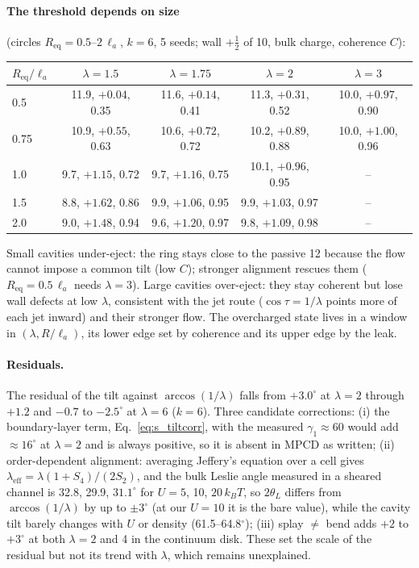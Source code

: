 \documentclass[aps,prl,onecolumn,superscriptaddress,amsmath,amssymb,nofootinbib]{revtex4-2}
\newcommand{\half}{\tfrac12}
\newcommand{\la}{\ell_a}
\newcommand{\kT}{k_BT}
\begin{document}
\paragraph{The threshold depends on size} (circles $R_\mathrm{eq}=0.5$--$2\,\la$, $k=6$, 5 seeds; wall $+\half$ of 10, bulk charge, coherence $C$):
\begin{center}\small\begin{tabular}{lcccc}\hline
$R_\mathrm{eq}/\la$ & $\lambda=1.5$ & $\lambda=1.75$ & $\lambda=2$ & $\lambda=3$\\\hline
0.5 & 11.9, $+0.04$, 0.35 & 11.6, $+0.14$, 0.41 & 11.3, $+0.31$, 0.52 & 10.0, $+0.97$, 0.90\\
0.75 & 10.9, $+0.55$, 0.63 & 10.6, $+0.72$, 0.72 & 10.2, $+0.89$, 0.88 & 10.0, $+1.00$, 0.96\\
1.0 & 9.7, $+1.15$, 0.72 & 9.7, $+1.16$, 0.75 & 10.1, $+0.96$, 0.95 & --\\
1.5 & 8.8, $+1.62$, 0.86 & 9.9, $+1.06$, 0.95 & 9.9, $+1.03$, 0.97 & --\\
2.0 & 9.0, $+1.48$, 0.94 & 9.6, $+1.20$, 0.97 & 9.8, $+1.09$, 0.98 & --\\\hline
\end{tabular}\end{center}
Small cavities under-eject: the ring stays close to the passive 12 because the flow cannot impose a common tilt (low $C$); stronger alignment rescues them ($R_\mathrm{eq}=0.5\,\la$ needs
$\lambda=3$). Large cavities over-eject: they stay coherent but lose wall defects at low $\lambda$, consistent with the jet route ($\cos\tau=1/\lambda$ points more of each jet inward) and
their stronger flow. The overcharged state lives in a window in $(\lambda,R/\la)$, its lower edge set by coherence and its upper edge by the leak.

\paragraph{Residuals.} The residual of the tilt against $\arccos(1/\lambda)$ falls from $+3.0^\circ$ at $\lambda=2$ through $+1.2$ and $-0.7$ to $-2.5^\circ$ at $\lambda=6$ ($k=6$).
Three candidate corrections: (i) the boundary-layer term, Eq.~\eqref{eq:s_tiltcorr}, with the measured $\gamma_1\approx60$ would add $\approx16^\circ$ at $\lambda=2$ and is always
positive, so it is absent in MPCD as written; (ii) order-dependent alignment: averaging Jeffery's equation over a cell gives $\lambda_\mathrm{eff}=\lambda(1+S_4)/(2S_2)$, and the
bulk Leslie angle measured in a sheared channel is 32.8, 29.9, $31.1^\circ$ for $U=5$, 10, $20\,\kT$, so $2\theta_L$ differs from $\arccos(1/\lambda)$ by up to $\pm3^\circ$ (at our
$U=10$ it is the bare value), while the cavity tilt barely changes with $U$ or density (61.5--64.8$^\circ$); (iii) splay $\neq$ bend adds $+2$ to $+3^\circ$ at both $\lambda=2$ and 4 in
the continuum disk. These set the scale of the residual but not its trend with $\lambda$, which remains unexplained.
\end{document}
